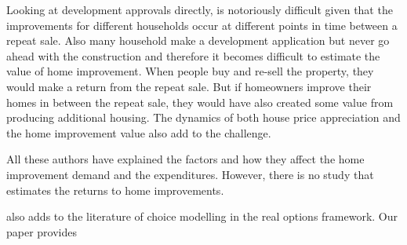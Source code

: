 Looking at development approvals directly, is notoriously difficult given that the improvements for different households occur at different points in time between a repeat sale. Also many household make a development application but never go ahead with the construction and therefore it becomes difficult to estimate the value of home improvement. When people buy and re-sell the property, they would make a return from the repeat sale. But if homeowners improve their homes in between the repeat sale, they would have also created some value from producing additional housing. The dynamics of both house price appreciation and the home improvement value also add to the challenge.



All these authors have explained the factors and how they affect the home improvement demand and the expenditures. However, there is no study that estimates the returns to home improvements. 


   also adds to the literature of choice modelling in the real options framework. Our paper provides 